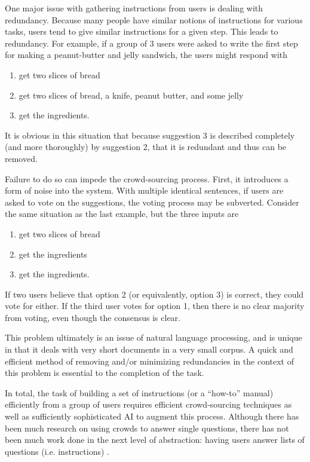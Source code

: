 One major issue with gathering instructions from users is dealing with redundancy.
Because many people have similar notions of instructions for various tasks, users tend to give similar instructions for a given step.
This leads to redundancy. For example, if a group of 3 users were asked to write the first step for making a peanut-butter and jelly sandwich, the users might respond with
\begin{enumerate}
\item get two slices of bread
\item get two slices of bread, a knife, peanut butter, and some jelly
\item get the ingredients.
\end{enumerate}
It is obvious in this situation that because suggestion 3 is described completely (and more thoroughly) by suggestion 2, that it is redundant and thus can be removed.

Failure to do so can impede the crowd-sourcing process.
First, it introduces a form of noise into the system.
With multiple identical sentences, if users are asked to vote on the suggestions, the voting process may be subverted.
Consider the same situation as the last example, but the three inputs are
\begin{enumerate}
\item get two slices of bread
\item get the ingredients
\item get the ingredients.
\end{enumerate}
If two users believe that option 2 (or equivalently, option 3) is correct, they could vote for either. 
If the third user votes for option 1, then there is no clear majority from voting, even though the consensus is clear.

This problem ultimately is an issue of natural language processing, and is unique in that it deals with very short documents in a very small corpus. 
A quick and efficient method of removing and/or minimizing redundancies in the context of this problem is essential to the completion of the task.

In total, the task of building a set of instructions (or a ``how-to'' manual) efficiently from a group of users requires efficient crowd-sourcing techniques as well as sufficiently sophisticated AI to augment this process.
Although there has been much research on using crowds to answer single questions, there has not been much work done in the next level of abstraction: having users answer lists of questions (i.e. instructions) \cite{lasecki2013chorus,bigham2010vizwiz}.


